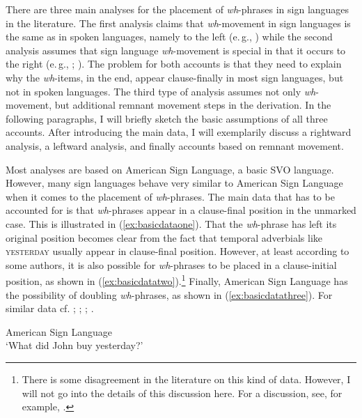 There are three main analyses for the placement of \textit{wh}-phrases in sign languages in the literature. The first analysis claims that \textit{wh}-movement in sign languages is the same as in spoken languages, namely to the left (e.\,g., \citealt{petronio1997}) while the second analysis assumes that sign language \textit{wh}-movement is special in that it occurs to the right (e.\,g., \citealt{aarons1992clausal}; \citealt{cecchetto2009another}). The problem for both accounts is that they need to explain why the \textit{wh}-items, in the end, appear clause-finally in most sign languages, but not in spoken languages. The third type of analysis assumes not only \textit{wh}-movement, but additional remnant movement steps in the derivation. In the following paragraphs, I will briefly sketch the basic assumptions of all three accounts. After introducing the main data, I will exemplarily discuss a rightward analysis, a leftward analysis, and finally  accounts based on remnant movement. 

Most analyses are based on American Sign Language, a basic SVO language. However, many sign languages behave very similar to American Sign Language when it comes to the placement of \textit{wh}-phrases. The main data that has to be accounted for is that \textit{wh}-phrases appear in a clause-final position in the unmarked case. This is illustrated in (\ref{ex:basicdataone}). That the \textit{wh}-phrase has left its original position becomes clear from the fact that temporal adverbials like \textsc{yesterday} usually appear in clause-final position. However, at least according to some authors, it is also possible for \textit{wh}-phrases to be placed in a clause-initial position, as shown in (\ref{ex:basicdatatwo}).\footnote{ There is some disagreement in the literature on this kind of data. However, I will not go into the details of this discussion here. For a discussion, see, for example, \citet[445--447]{sandler2006sign}.} Finally, American Sign Language has the possibility of doubling \textit{wh}-phrases, as shown in (\ref{ex:basicdatathree}). For similar data cf. \citet[26]{petronio1997}; \citet{lillo2006position}; \citet[110--115]{neidle2000syntax}; \citet[664]{pichler}.

\begin{exe}
\ex American Sign Language \\
%
\glt `What did John buy yesterday?' \label{ex:basicdataone} 
\end{exe}


